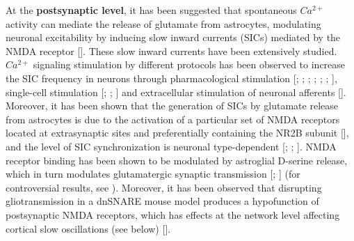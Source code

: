 At the \textbf{postsynaptic level}, it has been suggested that spontaneous $Ca^{2+}$ activity can mediate the release of glutamate from astrocytes, modulating neuronal excitability by inducing slow inward currents (SICs) mediated by the NMDA receptor [\cite{parri2001spontaneous}].
These slow inward currents have been extensively studied.
$Ca^{2+}$ signaling stimulation by different protocols has been observed to increase the SIC frequency in neurons through pharmacological stimulation [\cite{angulo2004}; \cite{kang2005astrocytic}; \cite{kozlov2006target}; \cite{fellin2006purinergic}; \cite{nestor2007plasticity}; \cite{navarrete2008endocannabinoids}; \cite{shigetomi2008two}], single-cell stimulation [\cite{d2007mglur5}; \cite{fellin2004neuronal}; \cite{perea2005}] and extracellular stimulation of neuronal afferents [\cite{fellin2004neuronal}].
Moreover, it has been shown that the generation of SICs by glutamate release from astrocytes is due to the activation of a particular set of NMDA receptors located at extrasynaptic sites and preferentially containing the NR2B subunit [\cite{fellin2004neuronal}], and the level of SIC synchronization is neuronal type-dependent [\cite{fellin2004neuronal}; \cite{angulo2004}; \cite{kozlov2006target}].
NMDA receptor binding has been shown to be modulated by astroglial D-serine release, which in turn modulates glutamatergic synaptic transmission [\cite{panatier2006}; \cite{henneberger2010}] (for controversial results, see \cite{wolosker2016rise}). 
Moreover, it has been observed that disrupting gliotransmission in a dnSNARE mouse model produces a hypofunction of postsynaptic NMDA receptors, which has effects at the network level affecting cortical slow oscillations (see below) [\cite{fellin2009}].

